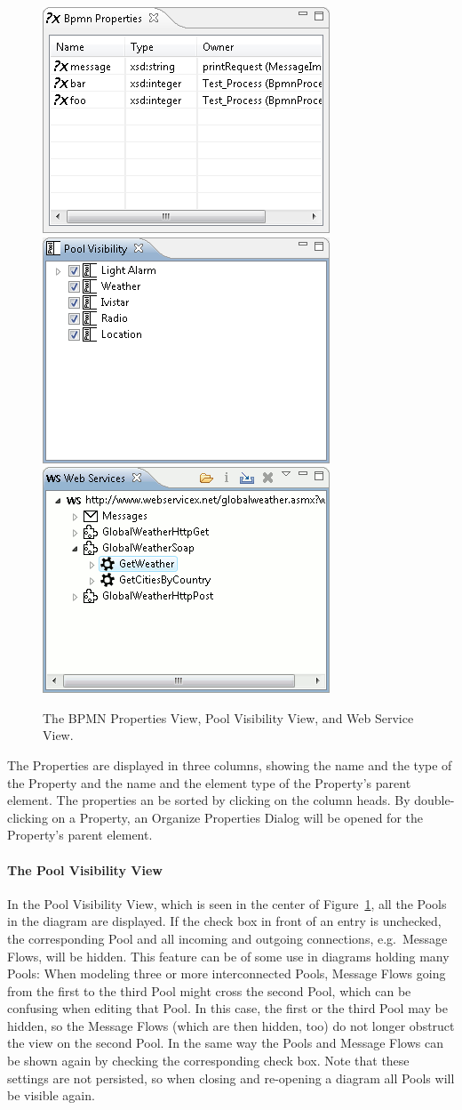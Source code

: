 \begin{figure}[t]
	\centering
	\includegraphics[width=.3\textwidth]{figures/features/propView.png}
	\hspace{.5cm}
	\includegraphics[width=.3\textwidth]{figures/features/poolView.png}
	\hspace{.5cm}
	\includegraphics[width=.3\textwidth]{figures/features/wsView.png}
	\caption{The BPMN Properties View, Pool Visibility View, and Web Service View.}
	\label{fig:customViews}
\end{figure}

The Properties are displayed in three columns, showing the name and the type of
the Property and the name and the element type of the Property's parent element.
The properties an be sorted by clicking on the column heads.  By double-clicking
on a Property, an Organize Properties Dialog will be opened for the Property's
parent element.

\paragraph*{The Pool Visibility View}

In the Pool Visibility View, which is seen in the center of Figure~\ref{fig:customViews},
all the Pools in the diagram are displayed.  If the check box in front of an entry
is unchecked, the corresponding Pool and all incoming and outgoing connections,
e.g.\ Message Flows, will be hidden.  This feature can be of some use in diagrams
holding many Pools: When modeling three or more interconnected Pools, Message
Flows going from the first to the third Pool might cross the second Pool, which
can be confusing when editing that Pool.  In this case, the first or the third
Pool may be hidden, so the Message Flows (which are then hidden, too) do not
longer obstruct the view on the second Pool.  In the same way the Pools and
Message Flows can be shown again by checking the corresponding check box.  Note
that these settings are not persisted, so when closing and re-opening a diagram
all Pools will be visible again.

